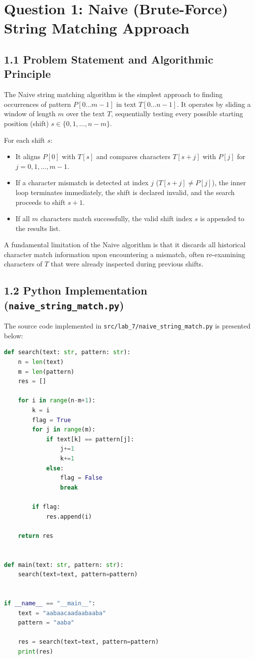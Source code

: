 \documentclass[12pt]{article}
\begin{document}
\section*{Question 1: Naive (Brute-Force) String Matching Approach}

\subsection*{1.1 Problem Statement and Algorithmic Principle}
The Naive string matching algorithm is the simplest approach to finding occurrences of pattern $P[0 \dots m-1]$ in text $T[0 \dots n-1]$. It operates by sliding a window of length $m$ over the text $T$, sequentially testing every possible starting position (shift) $s \in \{0, 1, \dots, n-m\}$.

For each shift $s$:
\begin{itemize}
    \item It aligns $P[0]$ with $T[s]$ and compares characters $T[s+j]$ with $P[j]$ for $j = 0, 1, \dots, m-1$.
    \item If a character mismatch is detected at index $j$ ($T[s+j] \ne P[j]$), the inner loop terminates immediately, the shift is declared invalid, and the search proceeds to shift $s+1$.
    \item If all $m$ characters match successfully, the valid shift index $s$ is appended to the results list.
\end{itemize}

A fundamental limitation of the Naive algorithm is that it discards all historical character match information upon encountering a mismatch, often re-examining characters of $T$ that were already inspected during previous shifts.

\subsection*{1.2 Python Implementation (\texttt{naive\_string\_match.py})}
The source code implemented in \texttt{src/lab\_7/naive\_string\_match.py} is presented below:

\begin{lstlisting}[language=Python]
def search(text: str, pattern: str):
    n = len(text)
    m = len(pattern)
    res = []

    for i in range(n-m+1):
        k = i
        flag = True
        for j in range(m):
            if text[k] == pattern[j]:
                j+=1
                k+=1
            else:
                flag = False
                break
        
        if flag:
            res.append(i)
    
    return res


def main(text: str, pattern: str):
    search(text=text, pattern=pattern)


if __name__ == "__main__":
    text = "aabaacaadaabaaba"
    pattern = "aaba"

    res = search(text=text, pattern=pattern)
    print(res)
\end{lstlisting}
\end{document}
